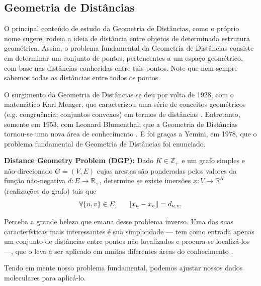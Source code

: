 \documentclass[a4paper,12pt]{article}
\begin{document}
	\subsection{Geometria de Distâncias}
	O principal conteúdo de estudo da Geometria de Distâncias, como o próprio nome sugere, rodeia a ideia de distância entre objetos de determinada estrutura geométrica. Assim, o problema fundamental da Geometria de Distâncias consiste em determinar um conjunto de pontos, pertencentes a um espaço geométrico, com base nas distâncias conhecidas entre tais pontos. Note que nem sempre sabemos todas as distâncias entre todos os pontos.
	
	O surgimento da Geometria de Distâncias se deu por volta de 1928, com o matemático Karl Menger, que caracterizou uma série de conceitos geométricos (e.g. congruência; conjuntos convexos) em termos de distâncias \cite{carlileGDandAplications}. Entretanto, somente em 1953, com Leonard Blumenthal, que a Geometria de Distâncias tornou-se uma nova área de conhecimento \cite{carlileBook31Coloquio}. E foi graças a Yemini, em 1978, que o problema fundamental de Geometria de Distâncias foi enunciado.
	
	\begin{center}
		\begin{minipage}{0.9 \linewidth}
			\textbf{Distance Geometry Problem (DGP):} Dado $K \in \mathbb{Z}_{+}$ e um grafo simples e não-direcionado $G = (V,E)$ cujas arestas são ponderadas pelos valores da função não-negativa $d: E \longrightarrow \mathbb{R}_{+}$, determine se existe imersões $x:V \longrightarrow \mathbb{R}^{K}$ (realizações do grafo) tais que
			\begin{equation}
			\forall \{u,v\} \in E, \hspace{0.5cm} \left\| x_{u} - x_{v} \right\| = d_{u,v}. \label{eq:DGP}
			\end{equation}
		\end{minipage}
	\end{center}
	
	Perceba a grande beleza que emana desse problema inverso. Uma das suas características mais interessantes é sua simplicidade --- tem como entrada apenas um conjunto de distâncias entre pontos não localizados e procura-se localizá-los ---, que o leva a ser aplicado em muitas diferentes áreas do conhecimento \cite{carlileGDandAplications}. 
	
	Tendo em mente nosso problema fundamental, podemos ajustar nossos dados moleculares para aplicá-lo.
	
\end{document}
